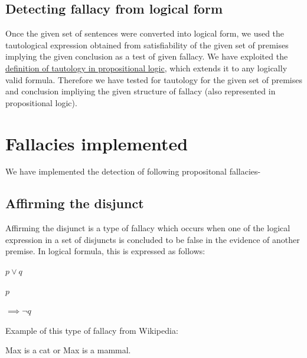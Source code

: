 \documentclass[english]{article}
\begin{document}
\subsection{Detecting fallacy from logical form}

Once the given set of sentences were converted into logical form,
we used the tautological expression obtained from satisfiability of
the given set of premises implying the given conclusion as a test
of given fallacy. We have exploited the \href{http://en.wikipedia.org/wiki/Tautology_(logic)}{definition of tautology in propositional logic},
which extends it to any logically valid formula. Therefore we have
tested for tautology for the given set of premises and conclusion
impliying the given structure of fallacy (also represented in propositional
logic). 


\section{Fallacies implemented}

We have implemented the detection of following propositonal fallacies-


\subsection{Affirming the disjunct}

Affirming the disjunct is a type of fallacy which occurs when one
of the logical expression in a set of disjuncts is concluded to be
false in the evidence of another premise. In logical formula, this
is expressed as follows:

\begin{center}
$p\vee q$
\par\end{center}

\begin{center}
$p$
\par\end{center}

\begin{center}
$\implies\neg q$
\par\end{center}

Example of this type of fallacy from Wikipedia: 

\begin{center}
Max is a cat or Max is a mammal.
\par\end{center}
\end{document}
